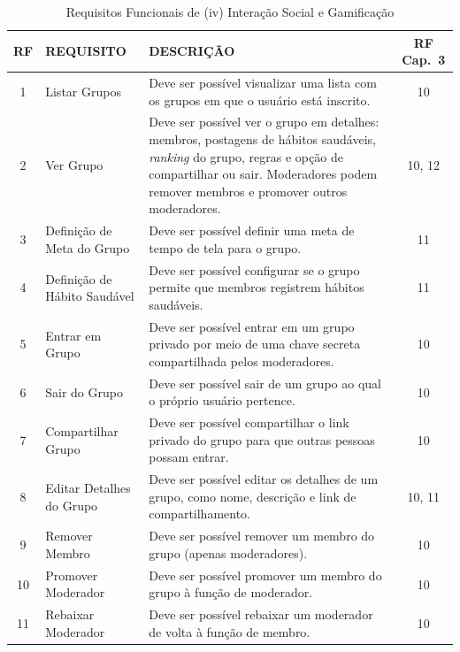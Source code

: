 \begin{table}[H]
\centering
\caption{Requisitos Funcionais de (iv) Interação Social e Gamificação}
\begin{tabularx}{\textwidth}{|c|l|X|c|}
\hline
\rowcolor{verdeclaro}
\textbf{RF} & \textbf{REQUISITO} & \textbf{DESCRIÇÃO} & \textbf{RF Cap.~3} \\ \hline

1 & Listar Grupos &
Deve ser possível visualizar uma lista com os grupos em que o usuário está inscrito. & 10 \\ \hline

2 & Ver Grupo &
Deve ser possível ver o grupo em detalhes: membros, postagens de hábitos saudáveis, \textit{ranking} do grupo, regras e opção de compartilhar ou sair. Moderadores podem remover membros e promover outros moderadores. & 10, 12 \\ \hline

3 & Definição de Meta do Grupo &
Deve ser possível definir uma meta de tempo de tela para o grupo. & 11 \\ \hline

4 & Definição de Hábito Saudável &
Deve ser possível configurar se o grupo permite que membros registrem hábitos saudáveis. & 11 \\ \hline

5 & Entrar em Grupo &
Deve ser possível entrar em um grupo privado por meio de uma chave secreta compartilhada pelos moderadores. & 10 \\ \hline

6 & Sair do Grupo &
Deve ser possível sair de um grupo ao qual o próprio usuário pertence. & 10 \\ \hline

7 & Compartilhar Grupo &
Deve ser possível compartilhar o link privado do grupo para que outras pessoas possam entrar. & 10 \\ \hline

8 & Editar Detalhes do Grupo &
Deve ser possível editar os detalhes de um grupo, como nome, descrição e link de compartilhamento. & 10, 11 \\ \hline

9 & Remover Membro &
Deve ser possível remover um membro do grupo (apenas moderadores). & 10 \\ \hline

10 & Promover Moderador &
Deve ser possível promover um membro do grupo à função de moderador. & 10 \\ \hline

11 & Rebaixar Moderador &
Deve ser possível rebaixar um moderador de volta à função de membro. & 10 \\ \hline

\end{tabularx}
\end{table}

